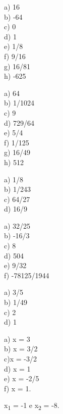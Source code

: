 \begin{respostas}{2}
	\ansitem{} a) 16 \\ b) -64 \\ c) 0 \\ d) 1 \\ e) 1/8 \\  f) 9/16 \\ g) 16/81 \\ h) -625

	\ansitem{} a) 64 \\ b) 1/1024 \\ c) 9 \\ d) 729/64 \\ e) 5/4 \\ f) 1/125 \\  g) 16/49 \\ h) 512

    \ansitem{} a) 1/8 \\ b) 1/243 \\ c) 64/27 \\ d) 16/9
    
    \setcounter{enumi}{5}

	\ansitem{} a) 32/25 \\ b) -16/3 \\  c) 8 \\  d) 504 \\  e) 9/32 \\  f) -78125/1944

	\ansitem{} a) 3/5 \\ b) 1/49 \\  c) 2 \\  d) 1

	\ansitem{} a) x = 3 \\ b) x = 3/2 \\ c)x = -3/2 \\ d) x = 1 \\ e) x = -2/5 \\ f) x = 1.

    \ansitem{} x\textsubscript{1 }= -1 e x\textsubscript{2} = -8.
\end{respostas}

